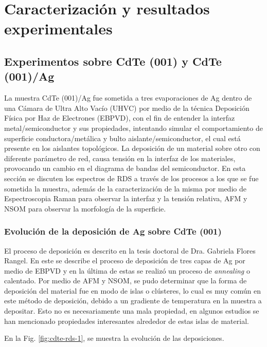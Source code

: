 \chapter{Caracterización y resultados experimentales}
\label{chap:results}
\textit{}
\vfill
\minitoc
\newpage

\section{Experimentos sobre CdTe (001) y CdTe (001)/Ag}
\label{sec:chap4-cdte}

La muestra CdTe (001)/Ag fue sometida a tres evaporaciones de Ag dentro de una Cámara de Ultra Alto Vacío (UHVC) por medio de la técnica Deposición Física por Haz de Electrones (EBPVD), con el fin de entender la interfaz metal/semiconductor y sus propiedades, intentando simular el comportamiento de superficie conductora/metálica y bulto aislante/semiconductor, el cual está presente en los aislantes topológicos. La deposición de un material sobre otro con diferente parámetro de red, causa tensión en la interfaz de los materiales, provocando un cambio en el diagrama de bandas del semiconductor.
En esta sección se discuten los espectros de RDS a través de los procesos a los que se fue sometida la muestra, además de la caracterización de la misma por medio de Espectroscopia Raman para observar la interfaz y la tensión relativa, AFM y NSOM para observar la morfología de la superficie.

\subsection{Evolución de la deposición de Ag sobre CdTe (001)}
\label{sec:chap4-cdte-rds}
El proceso de deposición es descrito en la tesis doctoral de Dra. Gabriela Flores Rangel\cite{PdHGaby}. En este se describe el proceso de deposición de tres capas de Ag por medio de EBPVD y en la última de estas se realizó un proceso de \textit{annealing} o calentado. Por medio de AFM y NSOM, se pudo determinar que la forma de deposición del material fue en modo de islas o clústeres, lo cual es muy común en este método de deposición, debido a un gradiente de temperatura en la muestra a depositar. Esto no es necesariamente una mala propiedad, en algunos estudios se han mencionado propiedades interesantes alrededor de estas islas de material\cite{Zhou2018, Bihlmayer2006}. 

En la Fig. \ref{fig:cdte-rds-1}, se muestra la evolución de las deposiciones.

